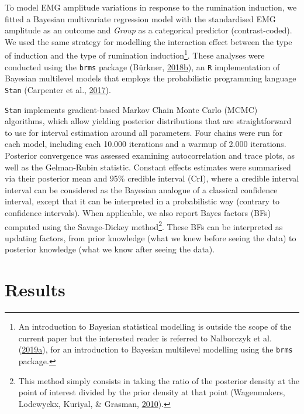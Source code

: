 \documentclass[a4paper,12pt,twoside,onecolumn,openright,final,oldfontcommands]{memoir}
\let\rmarkdownfootnote\footnote%
\def\footnote{\protect\rmarkdownfootnote}
\begin{document}
To model EMG amplitude variations in response to the rumination induction, we fitted a Bayesian multivariate regression model with the standardised EMG amplitude as an outcome and \emph{Group} as a categorical predictor (contrast-coded). We used the same strategy for modelling the interaction effect between the type of induction and the type of rumination induction\footnote{An introduction to Bayesian statistical modelling is outside the scope of the current paper but the interested reader is referred to Nalborczyk et al. (\protect\hyperlink{ref-nalborczyk_introduction_2019}{2019}\protect\hyperlink{ref-nalborczyk_introduction_2019}{a}), for an introduction to Bayesian multilevel modelling using the \texttt{brms} package.}. These analyses were conducted using the \texttt{brms} package (Bürkner, \protect\hyperlink{ref-R-brms}{2018}\protect\hyperlink{ref-R-brms}{b}), an \texttt{R} implementation of Bayesian multilevel models that employs the probabilistic programming language \texttt{Stan} (Carpenter et al., \protect\hyperlink{ref-carpenter_stan_2017}{2017}).

\texttt{Stan} implements gradient-based Markov Chain Monte Carlo (MCMC) algorithms, which allow yielding posterior distributions that are straightforward to use for interval estimation around all parameters. Four chains were run for each model, including each 10.000 iterations and a warmup of 2.000 iterations. Posterior convergence was assessed examining autocorrelation and trace plots, as well as the Gelman-Rubin statistic. Constant effects estimates were summarised via their posterior mean and 95\% credible interval (CrI), where a credible interval interval can be considered as the Bayesian analogue of a classical confidence interval, except that it can be interpreted in a probabilistic way (contrary to confidence intervals). When applicable, we also report Bayes factors (BFs) computed using the Savage-Dickey method\footnote{This method simply consists in taking the ratio of the posterior density at the point of interest divided by the prior density at that point (Wagenmakers, Lodewyckx, Kuriyal, \& Grasman, \protect\hyperlink{ref-wagenmakers_bayesian_2010}{2010}).}. These BFs can be interpreted as updating factors, from prior knowledge (what we knew before seeing the data) to posterior knowledge (what we know after seeing the data).

\hypertarget{results-1}{%
\section{Results}\label{results-1}}
\end{document}
